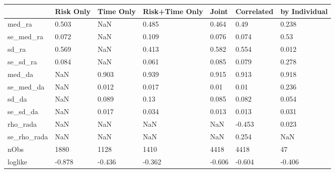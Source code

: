 \begin{tabular}{lllllll}
& Risk Only & Time Only & Risk+Time Only & Joint & Correlated & by Individual \\ 
\hline 
med_ra & 0.503 & NaN & 0.485 & 0.464 & 0.49 & 0.238 \\ 
se_med_ra & 0.072 & NaN & 0.109 & 0.076 & 0.074 & 0.53 \\ 
sd_ra & 0.569 & NaN & 0.413 & 0.582 & 0.554 & 0.012 \\ 
se_sd_ra & 0.084 & NaN & 0.061 & 0.085 & 0.079 & 0.278 \\ 
med_da & NaN & 0.903 & 0.939 & 0.915 & 0.913 & 0.918 \\ 
se_med_da & NaN & 0.012 & 0.017 & 0.01 & 0.01 & 0.236 \\ 
sd_da & NaN & 0.089 & 0.13 & 0.085 & 0.082 & 0.054 \\ 
se_sd_da & NaN & 0.017 & 0.034 & 0.013 & 0.013 & 0.031 \\ 
rho_rada & NaN & NaN & NaN & NaN & -0.453 & 0.023 \\ 
se_rho_rada & NaN & NaN & NaN & NaN & 0.254 & NaN \\ 
nObs & 1880 & 1128 & 1410 & 4418 & 4418 & 47 \\ 
loglike & -0.878 & -0.436 & -0.362 & -0.606 & -0.604 & -0.406 \\ 
\hline 
\end{tabular}